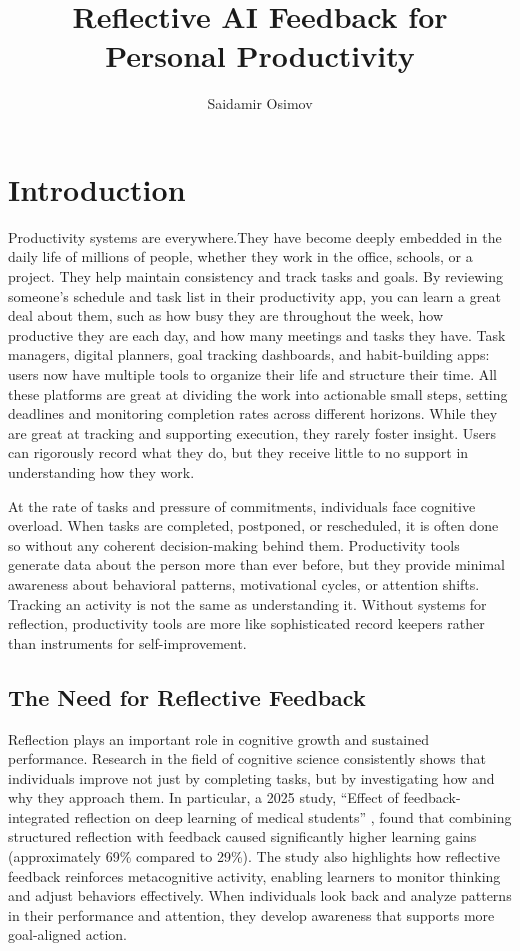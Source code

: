 \documentclass[12pt]{article}
\title{\textbf{Reflective AI Feedback for Personal Productivity}}
\author{Saidamir Osimov}
\begin{document}
\maketitle

\section{Introduction}
Productivity systems are everywhere.They have become deeply embedded in the daily life of millions of people, whether they work
 in the office, schools, or a project. They help maintain consistency and track tasks and goals. By reviewing someone's schedule 
 and task list in their productivity app, you can learn a great deal about them, such as how busy they are throughout the week, how 
 productive they are each day, and how many meetings and tasks they have. Task managers, digital planners, goal tracking dashboards, and
  habit-building apps: users now have multiple tools to organize their life and structure their time. All these platforms are great
   at dividing the work into actionable small steps, setting deadlines and monitoring completion rates across different horizons.
     While they are great at tracking and supporting execution, they rarely foster insight. Users can rigorously record what they do, 
     but they receive little to no support in understanding how they work.


At the rate of tasks and pressure of commitments, individuals face cognitive overload. When tasks are completed, postponed, or 
rescheduled, it is often done so without any coherent decision-making behind them. Productivity tools generate data about the
 person more than ever before, but they provide minimal awareness about behavioral patterns, motivational cycles, or attention
  shifts. Tracking an activity is not the same as understanding it. Without systems for reflection, productivity tools are more like 
  sophisticated record keepers rather than instruments for self-improvement.

\subsection{ The Need for Reflective Feedback }
Reflection plays an important role in cognitive growth and sustained performance. Research in the field of cognitive science 
consistently shows that individuals improve not just by completing tasks, but by investigating how and why they approach them. 
In particular, a 2025 study, “Effect of feedback-integrated reflection on deep learning of medical students” \cite{Maqsood2025}, 
found that combining structured reflection with feedback caused significantly higher learning gains (approximately 69\% compared 
to 29\%). The study also highlights how reflective feedback reinforces metacognitive activity, enabling learners to monitor thinking
 and adjust behaviors effectively. When individuals look back and analyze patterns in their performance and attention, they develop 
 awareness that supports more goal-aligned action.
\end{document}
